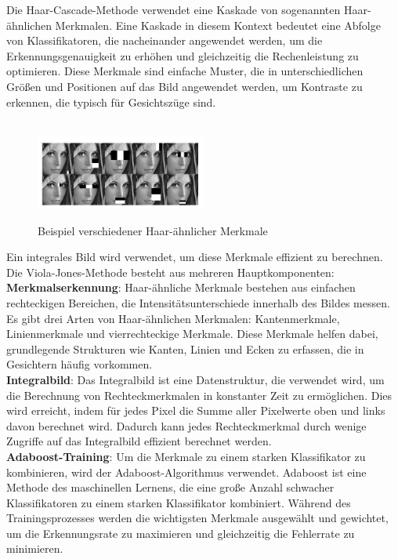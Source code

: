 \noindent Die Haar-Cascade-Methode verwendet eine Kaskade von sogenannten Haar-ähnlichen Merkmalen\cite{haar_quelle}. Eine Kaskade in diesem Kontext bedeutet eine Abfolge von Klassifikatoren, die nacheinander angewendet werden, um die Erkennungsgenauigkeit zu erhöhen und gleichzeitig die Rechenleistung zu optimieren. Diese Merkmale sind einfache Muster, die in unterschiedlichen Größen und Positionen auf das Bild angewendet werden, um Kontraste zu erkennen, die typisch für Gesichtszüge sind. \\ \\

\begin{figure}[h!]
    \centering
    \includegraphics[width=0.5\textwidth]{pictures/haarcascades.jpg}
    \caption{Beispiel verschiedener Haar-ähnlicher Merkmale}
    \label{fig:haar_cascade_example}
    \cite{haar_cascade_example}
\end{figure} 

\noindent Ein integrales Bild wird verwendet, um diese Merkmale effizient zu berechnen. Die Viola-Jones-Methode besteht aus mehreren Hauptkomponenten:\\

\noindent \textbf{Merkmalserkennung}: Haar-ähnliche Merkmale bestehen aus einfachen rechteckigen Bereichen, die Intensitätsunterschiede innerhalb des Bildes messen. Es gibt drei Arten von Haar-ähnlichen Merkmalen: Kantenmerkmale, Linienmerkmale und vierrechteckige Merkmale. Diese Merkmale helfen dabei, grundlegende Strukturen wie Kanten, Linien und Ecken zu erfassen, die in Gesichtern häufig vorkommen. \\

\noindent \textbf{Integralbild}: Das Integralbild ist eine Datenstruktur, die verwendet wird, um die Berechnung von Rechteckmerkmalen in konstanter Zeit zu ermöglichen. Dies wird erreicht, indem für jedes Pixel die Summe aller Pixelwerte oben und links davon berechnet wird. Dadurch kann jedes Rechteckmerkmal durch wenige Zugriffe auf das Integralbild effizient berechnet werden. \\

\noindent \textbf{Adaboost-Training}: Um die Merkmale zu einem starken Klassifikator zu kombinieren, wird der Adaboost-Algorithmus verwendet. Adaboost ist eine Methode des maschinellen Lernens, die eine große Anzahl schwacher Klassifikatoren zu einem starken Klassifikator kombiniert. Während des Trainingsprozesses werden die wichtigsten Merkmale ausgewählt und gewichtet, um die Erkennungsrate zu maximieren und gleichzeitig die Fehlerrate zu minimieren.\\

